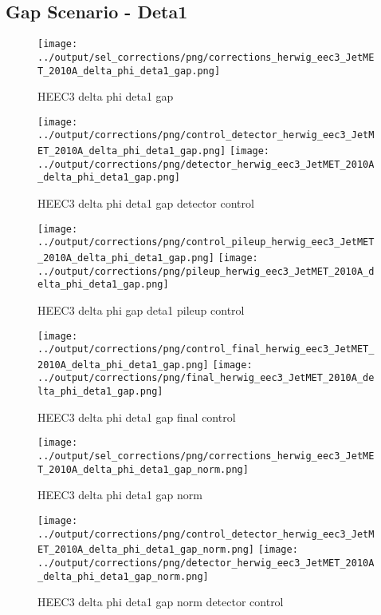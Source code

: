 \documentclass[11pt]{book}
\begin{document}
\clearpage
\subsection{Gap Scenario - Deta1}
\begin{figure}[ht]
\centering
\texttt{[image: ../output/sel\_corrections/png/corrections\_herwig\_eec3\_JetMET\_2010A\_delta\_phi\_deta1\_gap.png]}
\caption{HEEC3 delta phi deta1 gap}
\label{fig:HEEC3_JetMET_2010A_delta_phi_deta1_gap}
\end{figure}

\begin{figure}[ht]
\centering
\texttt{[image: ../output/corrections/png/control\_detector\_herwig\_eec3\_JetMET\_2010A\_delta\_phi\_deta1\_gap.png]}
\texttt{[image: ../output/corrections/png/detector\_herwig\_eec3\_JetMET\_2010A\_delta\_phi\_deta1\_gap.png]}
\caption{HEEC3 delta phi deta1 gap detector control}
\label{fig:HEEC3_JetMET_2010A_delta_phi_deta1_gap_detector_control}
\end{figure}

\begin{figure}[ht]
\centering
\texttt{[image: ../output/corrections/png/control\_pileup\_herwig\_eec3\_JetMET\_2010A\_delta\_phi\_deta1\_gap.png]}
\texttt{[image: ../output/corrections/png/pileup\_herwig\_eec3\_JetMET\_2010A\_delta\_phi\_deta1\_gap.png]}
\caption{HEEC3 delta phi gap deta1 pileup control}
\label{fig:HEEC3_JetMET_2010A_delta_phi_deta1_gap_pileup_control}
\end{figure}


\begin{figure}[ht]
\centering
\texttt{[image: ../output/corrections/png/control\_final\_herwig\_eec3\_JetMET\_2010A\_delta\_phi\_deta1\_gap.png]}
\texttt{[image: ../output/corrections/png/final\_herwig\_eec3\_JetMET\_2010A\_delta\_phi\_deta1\_gap.png]}
\caption{HEEC3 delta phi deta1 gap final control}
\label{fig:HEEC3_JetMET_2010A_delta_phi_deta1_gap_final_control}
\end{figure}

\begin{figure}[ht]
\centering
\texttt{[image: ../output/sel\_corrections/png/corrections\_herwig\_eec3\_JetMET\_2010A\_delta\_phi\_deta1\_gap\_norm.png]}
\caption{HEEC3 delta phi deta1 gap norm}
\label{fig:HEEC3_JetMET_2010A_delta_phi_deta1_gap_norm}
\end{figure}

\begin{figure}[ht]
\centering
\texttt{[image: ../output/corrections/png/control\_detector\_herwig\_eec3\_JetMET\_2010A\_delta\_phi\_deta1\_gap\_norm.png]}
\texttt{[image: ../output/corrections/png/detector\_herwig\_eec3\_JetMET\_2010A\_delta\_phi\_deta1\_gap\_norm.png]}
\caption{HEEC3 delta phi deta1 gap norm detector control}
\label{fig:HEEC3_JetMET_2010A_delta_phi_deta1_gap_norm_detector_control}
\end{figure}
\end{document}
